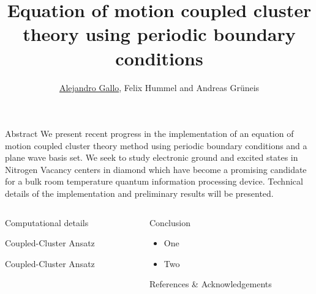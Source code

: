 \documentclass[final]{beamer}
\title{
  Equation of motion coupled cluster theory using periodic boundary conditions
}
\author{\underline{Alejandro Gallo}, Felix Hummel and Andreas Gr\"uneis}
\institute[]{
  Technical University of Vienna
}
\begin{document}
\nocite{*}
\begin{frame}[fragile]{}

  \begin{block}{\large Abstract}
    We present recent progress in the implementation of an equation of motion
    coupled cluster theory method using periodic boundary conditions and a plane
    wave basis set.  We seek to study electronic ground and excited states in
    Nitrogen Vacancy centers in diamond which have become a promising candidate
    for a bulk room temperature quantum information processing device. Technical
    details of the implementation and preliminary results will be presented.
  \end{block}
  \begin{columns}[t]
    \begin{column}{.49\linewidth}
      \begin{block}{\large Computational details}
        
      \end{block}
      \begin{block}{\large Coupled-Cluster Ansatz}
        
      \end{block}
      \begin{block}{\large Coupled-Cluster Ansatz}
        
      \end{block}
    \end{column}


    \begin{column}{.49\linewidth}

      \begin{block}{\large Conclusion}
        \begin{itemize}
          \item
            One
          \item
            Two
        \end{itemize}
      \end{block}

      \begin{block}{\large References \& Acknowledgements}
        \printbibliography
      \end{block}

    \end{column}

  \end{columns}

\end{frame}
\end{document}
